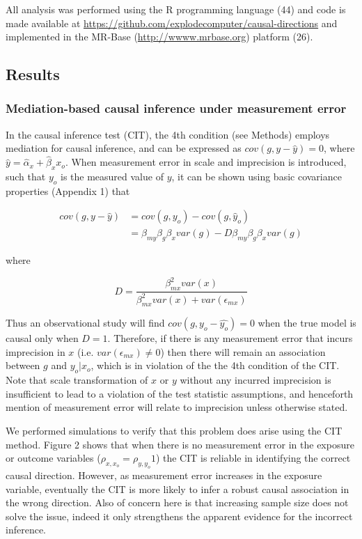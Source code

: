 \documentclass[]{article}
\begin{document}
All analysis was performed using the R programming language (44) and
code is made available at
\url{https://github.com/explodecomputer/causal-directions} and
implemented in the MR-Base (\url{http://wwww.mrbase.org}) platform (26).

\subsection{Results}\label{results}

\subsubsection{Mediation-based causal inference under measurement
error}\label{mediation-based-causal-inference-under-measurement-error}

In the causal inference test (CIT), the 4th condition (see Methods)
employs mediation for causal inference, and can be expressed as
\(cov(g, y - \hat{y}) = 0\), where
\(\hat{y} = \hat{\alpha}_x + \hat{\beta}_x x_o\). When measurement error
in scale and imprecision is introduced, such that \(y_o\) is the
measured value of \(y\), it can be shown using basic covariance
properties (Appendix 1) that

\[
\begin{aligned}
cov(g, y - \hat{y}) & = cov(g, y_o) - cov(g, \hat{y}_o)  \\
                    & = \beta_{my} \beta_g \beta_x var(g) - D \beta_{my} \beta_g \beta_x var(g)
\end{aligned}
\]

where

\[
D = \frac{\beta^2_{mx} var(x)} {\beta^2_{mx} var(x) + var(\epsilon_{mx})}
\]

Thus an observational study will find \(cov(g, y_o - \hat{y_o}) = 0\)
when the true model is causal only when \(D = 1\). Therefore, if there
is any measurement error that incurs imprecision in \(x\) (i.e.
\(var(\epsilon_{mx}) \neq 0\)) then there will remain an association
between \(g\) and \(y_o | x_o\), which is in violation of the the 4th
condition of the CIT. Note that scale transformation of \(x\) or \(y\)
without any incurred imprecision is insufficient to lead to a violation
of the test statistic assumptions, and henceforth mention of measurement
error will relate to imprecision unless otherwise stated.

We performed simulations to verify that this problem does arise using
the CIT method. Figure 2 shows that when there is no measurement error
in the exposure or outcome variables (\(\rho_{x, x_o}=\rho_{y, y_o}1\))
the CIT is reliable in identifying the correct causal direction.
However, as measurement error increases in the exposure variable,
eventually the CIT is more likely to infer a robust causal association
in the wrong direction. Also of concern here is that increasing sample
size does not solve the issue, indeed it only strengthens the apparent
evidence for the incorrect inference.
\end{document}
